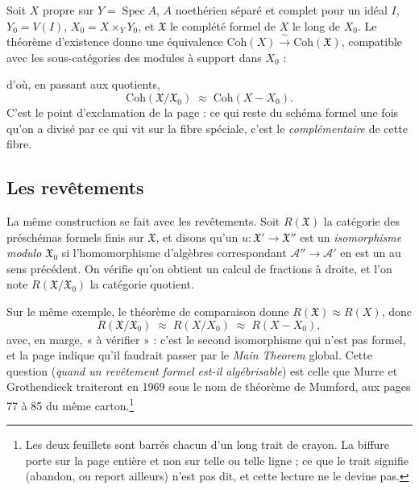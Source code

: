 \documentclass[11pt,a4paper]{article}
\begin{document}
Soit $X$ propre sur $Y = \operatorname{Spec} A$, $A$ noethérien séparé et
complet pour un idéal $I$, $Y_{0} = V(I)$, $X_{0} = X \times_{Y} Y_{0}$, et
$\mathfrak{X}$ le complété formel de $X$ le long de $X_{0}$. Le théorème
d'existence donne une équivalence
$\mathrm{Coh}(X) \xrightarrow{\ \sim\ } \mathrm{Coh}(\mathfrak{X})$, compatible
avec les sous-catégories des modules à support dans $X_{0}$ :


d'où, en passant aux quotients,
\[
  \mathrm{Coh}(\mathfrak{X}/\mathfrak{X}_{0}) \;\approx\;
  \mathrm{Coh}(X - X_{0}) .
\]
C'est le point d'exclamation de la page : ce qui reste du schéma formel une
fois qu'on a divisé par ce qui vit sur la fibre spéciale, c'est le
\emph{complémentaire} de cette fibre.

\subsection*{Les revêtements}

La même construction se fait avec les revêtements. Soit $R(\mathfrak{X})$ la
catégorie des préschémas formels finis sur $\mathfrak{X}$, et disons qu'un
$u : \mathfrak{X}' \to \mathfrak{X}''$ est un \emph{isomorphisme modulo
$\mathfrak{X}_{0}$} si l'homomorphisme d'algèbres correspondant
$\mathcal{A}'' \to \mathcal{A}'$ en est un au sens précédent. On vérifie qu'on
obtient un calcul de fractions à droite, et l'on note
$R(\mathfrak{X}/\mathfrak{X}_{0})$ la catégorie quotient.

Sur le même exemple, le théorème de comparaison donne
$R(\mathfrak{X}) \approx R(X)$, donc
\[
  R(\mathfrak{X}/\mathfrak{X}_{0}) \;\approx\; R(X/X_{0}) \;\approx\;
  R(X - X_{0}) ,
\]
avec, en marge, « à vérifier » : c'est le second isomorphisme qui n'est pas
formel, et la page indique qu'il faudrait passer par le \emph{Main Theorem}
global. Cette question (\emph{quand un revêtement formel est-il
algébrisable}) est celle que Murre et Grothendieck traiteront en
1969 sous le nom de théorème de Mumford, aux pages 77 à 85 du même
carton.\footnote{Les deux feuillets sont barrés chacun d'un long trait de
crayon. La biffure porte sur la page entière et non sur telle ou telle ligne ;
ce que le trait signifie (abandon, ou report ailleurs) n'est pas dit, et
cette lecture ne le devine pas.}
\end{document}
